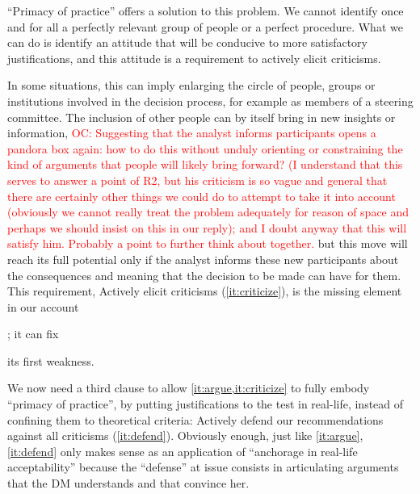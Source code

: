 \documentclass[preprint, french, english, 11pt, authoryear]{elsarticle}%
\newcommand{\commentOC}[1]{\textcolor{red}{OC: #1}}
\begin{document}
``Primacy of practice” offers a solution to this problem. We cannot identify once and for all a perfectly relevant group of people or a perfect procedure. 
What we can do is identify an attitude that will be conducive to more satisfactory justifications, and this attitude is a requirement to actively elicit criticisms.
\begin{changebar}In some situations, this can imply enlarging the circle of people, groups or institutions involved in the decision process, for example as members of a steering committee.
The inclusion of other people can by itself bring in new insights or information, \commentOC{Suggesting that the analyst informs participants opens a pandora box again: how to do this without unduly orienting or constraining the kind of arguments that people will likely bring forward? (I understand that this serves to answer a point of R2, but his criticism is so vague and general that there are certainly other things we could do to attempt to take it into account (obviously we cannot really treat the problem adequately for reason of space and perhaps we should insist on this in our reply); and I doubt anyway that this will satisfy him. Probably a point to further think about together.} but this move will reach its full potential only if the analyst informs these new participants about the consequences and meaning that the decision to be made can have for them.  
This requirement, Actively elicit criticisms (\ref{it:criticize}), is the missing element in our account\begin{changebar}; it can fix\end{changebar} its first weakness.\end{changebar}

We now need a third clause to allow \cref{it:argue,it:criticize} to fully embody “primacy of practice”, by putting justifications to the test in real-life, instead of confining them to theoretical criteria: Actively defend our recommendations against all criticisms (\ref{it:defend}).
Obviously enough, just like \cref{it:argue}, \cref{it:defend} only makes sense as an application of ``anchorage in real-life acceptability'' because the ``defense'' at issue consists in articulating arguments that the \ac{DM} understands and that convince her.
\end{document}
